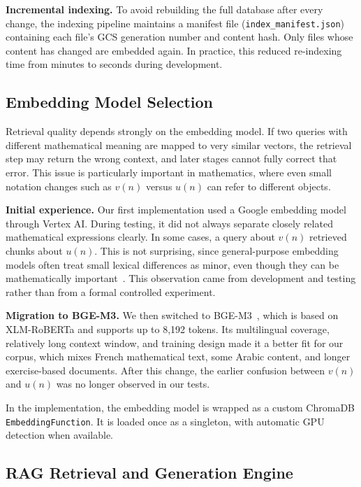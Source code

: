 \textbf{Incremental indexing.} To avoid rebuilding the full database after
every change, the indexing pipeline maintains a manifest file
(\texttt{index\_manifest.json}) containing each file's GCS generation number
and content hash. Only files whose content has changed are embedded again.
In practice, this reduced re-indexing time from minutes to seconds during
development.

\subsection{Embedding Model Selection}
\label{subsec:embedding-selection}

Retrieval quality depends strongly on the embedding model. If two queries
with different mathematical meaning are mapped to very similar vectors, the
retrieval step may return the wrong context, and later stages cannot fully
correct that error. This issue is particularly important in mathematics,
where even small notation changes such as $v(n)$ versus $u(n)$ can refer to
different objects.

\textbf{Initial experience.} Our first implementation used a Google
embedding model through Vertex AI. During testing, it did not always
separate closely related mathematical expressions clearly. In some cases, a
query about $v(n)$ retrieved chunks about $u(n)$. This is not surprising,
since general-purpose embedding models often treat small lexical differences
as minor, even though they can be mathematically important~\cite{mansouri2019tangent, pfahler2020math_embeddings}.
This observation came from development and testing rather than from a formal
controlled experiment.

\textbf{Migration to BGE-M3.} We then switched to
BGE-M3~\cite{chen2024bge_m3}, which is based on XLM-RoBERTa and supports up
to 8{,}192 tokens. Its multilingual coverage, relatively long context
window, and training design made it a better fit for our corpus, which mixes
French mathematical text, some Arabic content, and longer exercise-based
documents. After this change, the earlier confusion between $v(n)$ and
$u(n)$ was no longer observed in our tests.

In the implementation, the embedding model is wrapped as a custom ChromaDB
\texttt{EmbeddingFunction}. It is loaded once as a singleton, with automatic
GPU detection when available.

\subsection{RAG Retrieval and Generation Engine}
\label{subsec:retrieval-engine}

